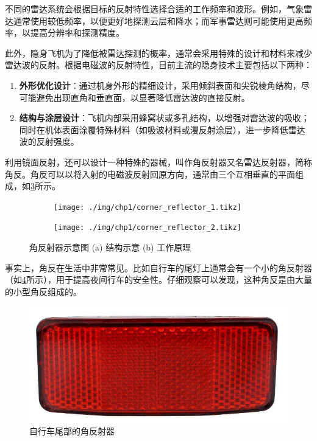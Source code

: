 不同的雷达系统会根据目标的反射特性选择合适的工作频率和波形。例如，气象雷达通常使用较低频率，以便更好地探测云层和降水；而军事雷达则可能使用更高频率，以提高分辨率和探测精度。

此外，隐身飞机为了降低被雷达探测的概率，通常会采用特殊的设计和材料来减少雷达波的反射。根据电磁波的反射特性，目前主流的隐身技术主要包括以下两种：
\begin{enumerate}
    \item \textbf{外形优化设计}：通过机身外形的精细设计，采用倾斜表面和尖锐棱角结构，尽可能避免出现直角和垂直面，以显著降低雷达波的直接反射。
    \item \textbf{结构与涂层设计}：飞机内部采用蜂窝状或多孔结构，以增强对雷达波的吸收；同时在机体表面涂覆特殊材料（如吸波材料或漫反射涂层），进一步降低雷达波的反射强度。
\end{enumerate}

利用镜面反射，还可以设计一种特殊的器械，叫作角反射器又名雷达反射器，简称角反。角反可以以将入射的电磁波反射回原方向，通常由三个互相垂直的平面组成，如\cref{fig_chp1_corner_reflector}所示。

\begin{figure}[htb!]
    \centering
    \begin{subfigure}{.3\textwidth}
        \centering
        \texttt{[image: ./img/chp1/corner\_reflector\_1.tikz]}
        \caption{}
        \label{fig_chp1_corner_reflector_1}
    \end{subfigure}
    \begin{subfigure}{.3\textwidth}
        \centering
        \texttt{[image: ./img/chp1/corner\_reflector\_2.tikz]}
        \caption{}
        \label{fig_chp1_corner_reflector_2}
    \end{subfigure}
    \caption{角反射器示意图 (a) 结构示意 (b) 工作原理}
    \label{fig_chp1_corner_reflector}
\end{figure}

事实上，角反在生活中非常常见。比如自行车的尾灯上通常会有一个小的角反射器（如\cref{fig_chp1_bike}所示），用于提高夜间行车的安全性。仔细观察可以发现，这种角反是由大量的小型角反组成的。

\begin{figure}[htb!]
    \centering
    \includegraphics[width=.4\textwidth]{./img/chp1/bike.jpeg}
    \caption{自行车尾部的角反射器}
    \label{fig_chp1_bike}
\end{figure}

